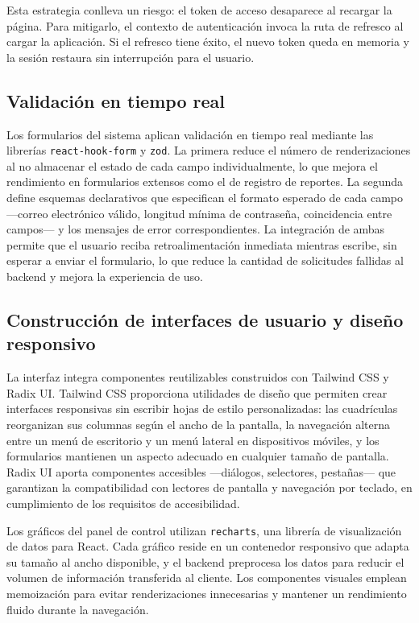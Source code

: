 Esta estrategia conlleva un riesgo: el token de acceso desaparece al recargar la página.
Para mitigarlo, el contexto de autenticación invoca la ruta de refresco al cargar la aplicación. 
Si el refresco tiene éxito, el nuevo token queda en memoria y la sesión restaura sin interrupción para el usuario.

\subsection{Validación en tiempo real}

Los formularios del sistema aplican validación en tiempo real mediante las librerías \texttt{react-hook-form} y \texttt{zod}. La primera reduce el número de renderizaciones al no almacenar el estado de cada campo individualmente, lo que mejora el rendimiento en formularios extensos como el de registro de reportes. La segunda define esquemas declarativos que especifican el formato esperado de cada campo —correo electrónico válido, longitud mínima de contraseña, coincidencia entre campos— y los mensajes de error correspondientes. La integración de ambas permite que el usuario reciba retroalimentación inmediata mientras escribe, sin esperar a enviar el formulario, lo que reduce la cantidad de solicitudes fallidas al backend y mejora la experiencia de uso.

\subsection{Construcción de interfaces de usuario y diseño responsivo}

La interfaz integra componentes reutilizables construidos con Tailwind CSS y Radix UI. 
Tailwind CSS proporciona utilidades de diseño que permiten crear interfaces responsivas sin escribir hojas de estilo personalizadas: las cuadrículas reorganizan sus columnas según el ancho de la pantalla, la navegación alterna entre un menú de escritorio y un menú lateral en dispositivos móviles, y los formularios mantienen un aspecto adecuado en cualquier tamaño de pantalla. 
Radix UI aporta componentes accesibles —diálogos, selectores, pestañas— que garantizan la compatibilidad con lectores de pantalla y navegación por teclado, en cumplimiento de los requisitos de accesibilidad.

Los gráficos del panel de control utilizan \texttt{recharts}, una librería de visualización de datos para React. 
Cada gráfico reside en un contenedor responsivo que adapta su tamaño al ancho disponible, y el backend preprocesa los datos para reducir el volumen de información transferida al cliente.
Los componentes visuales emplean memoización para evitar renderizaciones innecesarias y mantener un rendimiento fluido durante la navegación.

